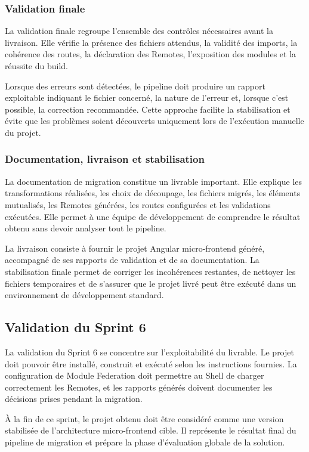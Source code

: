 \subsubsection{Validation finale}

La validation finale regroupe l'ensemble des contrôles nécessaires avant la livraison. Elle vérifie la présence des fichiers attendus, la validité des imports, la cohérence des routes, la déclaration des Remotes, l'exposition des modules et la réussite du build.

Lorsque des erreurs sont détectées, le pipeline doit produire un rapport exploitable indiquant le fichier concerné, la nature de l'erreur et, lorsque c'est possible, la correction recommandée. Cette approche facilite la stabilisation et évite que les problèmes soient découverts uniquement lors de l'exécution manuelle du projet.

\subsubsection{Documentation, livraison et stabilisation}

La documentation de migration constitue un livrable important. Elle explique les transformations réalisées, les choix de découpage, les fichiers migrés, les éléments mutualisés, les Remotes générées, les routes configurées et les validations exécutées. Elle permet à une équipe de développement de comprendre le résultat obtenu sans devoir analyser tout le pipeline.

La livraison consiste à fournir le projet Angular micro-frontend généré, accompagné de ses rapports de validation et de sa documentation. La stabilisation finale permet de corriger les incohérences restantes, de nettoyer les fichiers temporaires et de s'assurer que le projet livré peut être exécuté dans un environnement de développement standard.

\subsection{Validation du Sprint 6}

La validation du Sprint 6 se concentre sur l'exploitabilité du livrable. Le projet doit pouvoir être installé, construit et exécuté selon les instructions fournies. La configuration de Module Federation doit permettre au Shell de charger correctement les Remotes, et les rapports générés doivent documenter les décisions prises pendant la migration.

À la fin de ce sprint, le projet obtenu doit être considéré comme une version stabilisée de l'architecture micro-frontend cible. Il représente le résultat final du pipeline de migration et prépare la phase d'évaluation globale de la solution.

